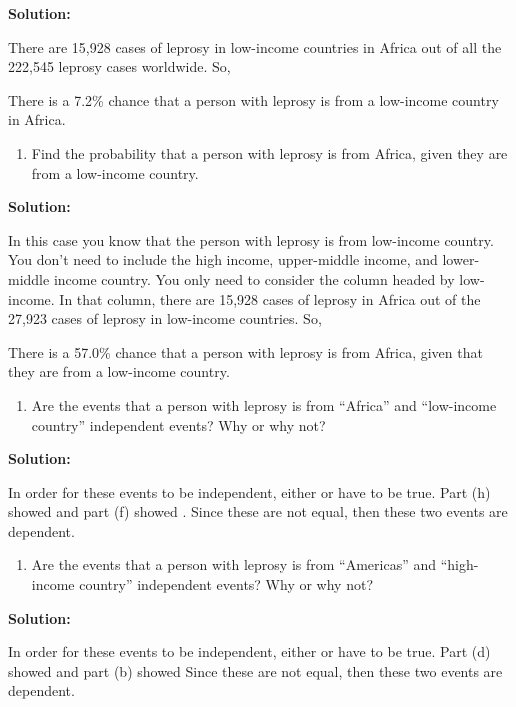 \documentclass[]{book}
\providecommand{\tightlist}{%
  \setlength{\itemsep}{0pt}\setlength{\parskip}{0pt}}
\begin{document}
\textbf{Solution:}

There are 15,928 cases of leprosy in low-income countries in Africa
out of all the 222,545 leprosy cases worldwide. So,

There is a 7.2\% chance that a person with leprosy is from a
low-income country in Africa.

\begin{enumerate}
\def\labelenumi{\alph{enumi}.}
\setcounter{enumi}{7}
\tightlist
\item
  Find the probability that a person with leprosy is from Africa,
  given they are from a low-income country.
\end{enumerate}

\textbf{Solution:}

In this case you know that the person with leprosy is from
low-income country. You don't need to include the high income,
upper-middle income, and lower-middle income country. You only need
to consider the column headed by low-income. In that column, there
are 15,928 cases of leprosy in Africa out of the 27,923 cases of
leprosy in low-income countries. So,

There is a 57.0\% chance that a person with leprosy is from Africa,
given that they are from a low-income country.

\begin{enumerate}
\def\labelenumi{\roman{enumi}.}
\tightlist
\item
  Are the events that a person with leprosy is from ``Africa'' and
  ``low-income country'' independent events? Why or why not?
\end{enumerate}

\textbf{Solution:}

In order for these events to be independent, either or have to be
true. Part (h) showed and part (f) showed . Since these are not
equal, then these two events are dependent.

\begin{enumerate}
\def\labelenumi{\alph{enumi}.}
\setcounter{enumi}{9}
\tightlist
\item
  Are the events that a person with leprosy is from ``Americas'' and
  ``high-income country'' independent events? Why or why not?
\end{enumerate}

\textbf{Solution:}

In order for these events to be independent, either or have to be
true. Part (d) showed and part (b) showed Since these are not equal,
then these two events are dependent.
\end{document}
